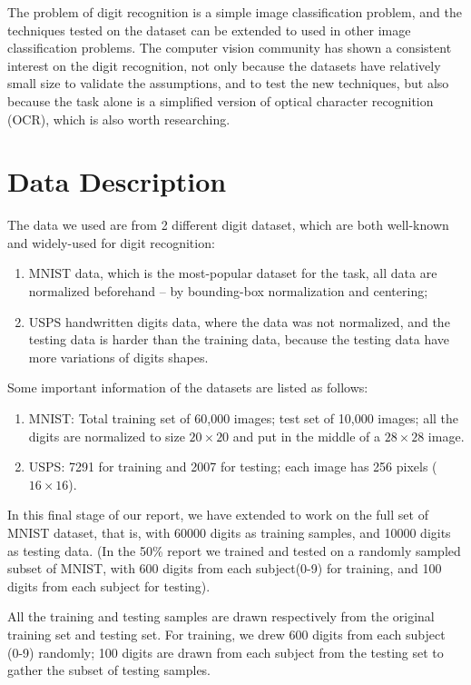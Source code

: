 \documentclass[12pt]{article}
\begin{document}
The problem of digit recognition is a simple image classification problem, and the techniques tested on the dataset can be extended to used in other image classification problems. The computer vision community has shown a consistent interest on the digit recognition, not only because the datasets have relatively small size to validate the assumptions, and to test the new techniques, but also because the task alone is a simplified version of optical character recognition (OCR), which is also worth researching. 


\section{Data Description}
\label{sec:data}
The data we used are from 2 different digit dataset, which are both well-known and widely-used for digit recognition:\begin{enumerate}
\item MNIST data\cite{lecun1998gradient}, which is the most-popular dataset for the task, all data are normalized beforehand -- by bounding-box normalization and centering;
\item USPS handwritten digits data\cite{hull1994database}, where the data was not normalized, and the testing data is harder than the training data, because the testing data have more variations of digits shapes.
\end{enumerate}

Some important information of the datasets are listed as follows:
\begin{enumerate}
\item MNIST: Total training set of 60,000 images; test set of 10,000 images; all the digits are normalized to size $20 \times 20$ and put in the middle of a $28 \times 28$ image.
\item USPS: 7291 for training and 2007 for testing; each image has 256 pixels ($16 \times 16$).
\end{enumerate}

In this final stage of our report, we have extended to work on the full set of MNIST dataset, that is, with 60000 digits as training samples, and 10000 digits as testing data. (In the 50\% report we trained and tested on a randomly sampled subset of MNIST, with 600 digits from each subject(0-9) for training, and 100 digits from each subject for testing). 

All the training and testing samples are drawn respectively from the original training set and testing set. For training, we drew 600 digits from each subject (0-9) randomly; 100 digits are drawn from each subject from the testing set to gather the subset of testing samples.
\end{document}
